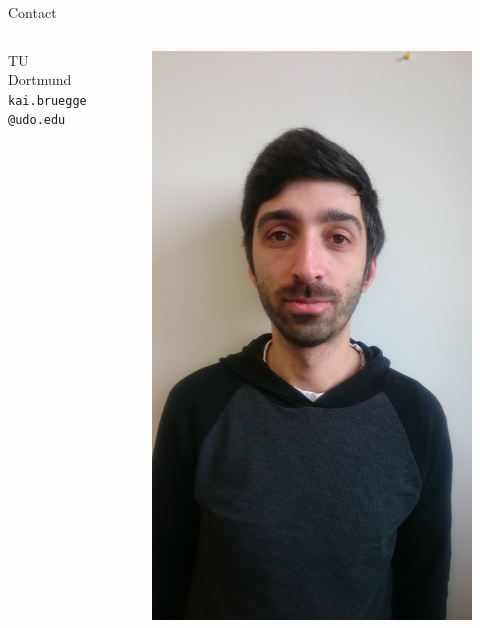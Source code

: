 \begin{columns}[t, onlytextwidth]
\begin{column}{0.30\textwidth}
\begin{block}[equal height group=bottom]{\normalsize Contact}
\begin{columns}[T]
\begin{column}{0.3\textwidth}
                TU Dortmund \\
                \texttt{kai.bruegge@udo.edu}
        \end{column}
        \begin{column}{0.2\textwidth}
              \begin{figure}
                \includegraphics[width=1.2\linewidth, angle=-90]{images/alexey.jpg}
              \end{figure}
        \end{column}

\end{columns}
\end{block}
\end{column}
\end{columns}
